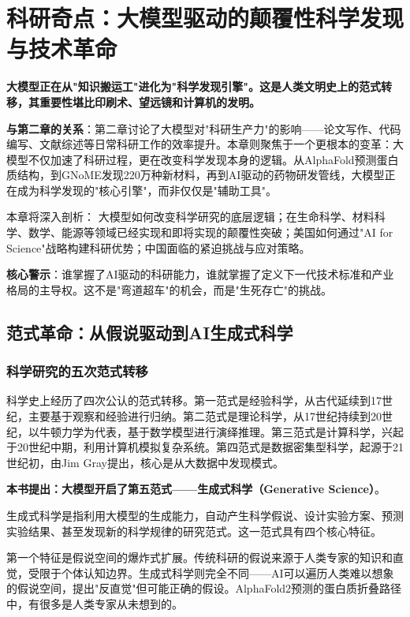 \chapter{科研奇点：大模型驱动的颠覆性科学发现与技术革命}

\textbf{大模型正在从"知识搬运工"进化为"科学发现引擎"。这是人类文明史上的范式转移，其重要性堪比印刷术、望远镜和计算机的发明。}

\textbf{与第二章的关系}：第二章讨论了大模型对"科研生产力"的影响——论文写作、代码编写、文献综述等日常科研工作的效率提升。本章则聚焦于一个更根本的变革：大模型不仅加速了科研过程，更在改变科学发现本身的逻辑。从AlphaFold预测蛋白质结构，到GNoME发现220万种新材料，再到AI驱动的药物研发管线，大模型正在成为科学发现的"核心引擎"，而非仅仅是"辅助工具"。

本章将深入剖析：
大模型如何改变科学研究的底层逻辑；在生命科学、材料科学、数学、能源等领域已经实现和即将实现的颠覆性突破；美国如何通过"AI for Science"战略构建科研优势；中国面临的紧迫挑战与应对策略。

\textbf{核心警示}：谁掌握了AI驱动的科研能力，谁就掌握了定义下一代技术标准和产业格局的主导权。这不是"弯道超车"的机会，而是"生死存亡"的挑战。

\section{范式革命：从假说驱动到AI生成式科学}

\subsection{科学研究的五次范式转移}

科学史上经历了四次公认的范式转移。第一范式是经验科学，从古代延续到17世纪，主要基于观察和经验进行归纳。第二范式是理论科学，从17世纪持续到20世纪，以牛顿力学为代表，基于数学模型进行演绎推理。第三范式是计算科学，兴起于20世纪中期，利用计算机模拟复杂系统。第四范式是数据密集型科学，起源于21世纪初，由Jim Gray提出，核心是从大数据中发现模式。

\textbf{本书提出：大模型开启了第五范式——生成式科学（Generative Science）}。

生成式科学是指利用大模型的生成能力，自动产生科学假说、设计实验方案、预测实验结果、甚至发现新的科学规律的研究范式。这一范式具有四个核心特征。

第一个特征是假说空间的爆炸式扩展。传统科研的假说来源于人类专家的知识和直觉，受限于个体认知边界。生成式科学则完全不同——AI可以遍历人类难以想象的假说空间，提出"反直觉"但可能正确的假设。AlphaFold2预测的蛋白质折叠路径中，有很多是人类专家从未想到的。

